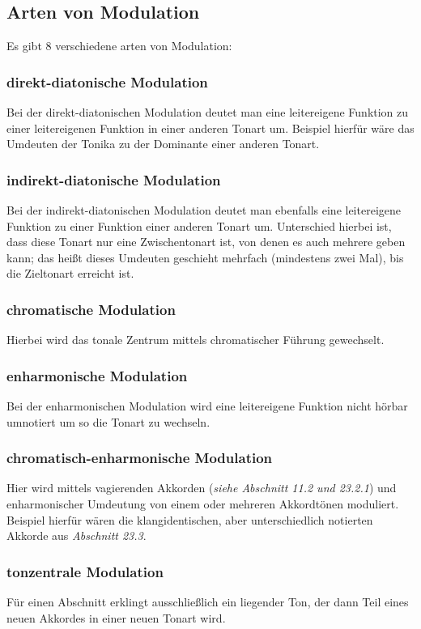 \documentclass[a4paper]{article}
\begin{document}
	
	\subsection{Arten von Modulation}
	Es gibt 8 verschiedene arten von Modulation:
	
	\subsubsection{direkt-diatonische Modulation}
	Bei der direkt-diatonischen Modulation deutet man eine leitereigene Funktion zu einer leitereigenen Funktion in einer anderen Tonart um. Beispiel hierfür wäre das Umdeuten der Tonika zu der Dominante einer anderen Tonart.
	
	\subsubsection{indirekt-diatonische Modulation}
	Bei der indirekt-diatonischen Modulation deutet man ebenfalls eine leitereigene Funktion zu einer Funktion einer anderen Tonart um. Unterschied hierbei ist, dass diese Tonart nur eine Zwischentonart ist, von denen es auch mehrere geben kann; das heißt dieses Umdeuten geschieht mehrfach (mindestens zwei Mal), bis die Zieltonart erreicht ist.
	
	\subsubsection{chromatische Modulation}
	Hierbei wird das tonale Zentrum mittels chromatischer Führung gewechselt.
	
	\subsubsection{enharmonische Modulation}
	Bei der enharmonischen Modulation wird eine leitereigene Funktion nicht hörbar umnotiert um so die Tonart zu wechseln.
	
	\subsubsection{chromatisch-enharmonische Modulation}
	Hier wird mittels vagierenden Akkorden (\textit{siehe Abschnitt 11.2 und 23.2.1}) und enharmonischer Umdeutung von einem oder mehreren Akkordtönen moduliert.
	Beispiel hierfür wären die klangidentischen, aber unterschiedlich notierten Akkorde aus \textit{Abschnitt 23.3}.
	
	\subsubsection{tonzentrale Modulation}
	Für einen Abschnitt erklingt ausschließlich ein liegender Ton, der dann Teil eines neuen Akkordes in einer neuen Tonart wird.
	
\end{document}
